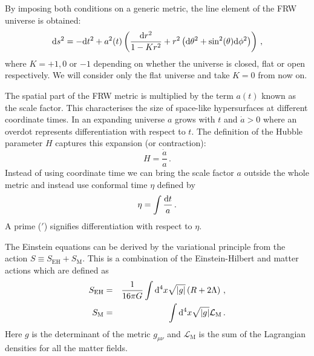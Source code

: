 By imposing both conditions on a generic metric, the line element of the
FRW universe is obtained:
\begin{equation}
 \label{eq:frwmetric-intro}
\mathrm{d} s^2 = -\mathrm{d} t^2 + a^2(t)
  \left( 
    \frac{\mathrm{d} r^2}{1-Kr^2} + r^2\left(\mathrm{d}\theta^2 + \sin^2(\theta) \mathrm{d}\phi^2\right)
  \right)\,,
\end{equation}
where $K=+1, 0$ or $-1$ depending on whether the universe is closed, flat
or open respectively. We will consider only the flat universe and take $K=0$
from now on. 


The spatial part of the FRW metric is multiplied by the term $a(t)$ known as the
scale factor. This characterises the size of space-like hypersurfaces at
different coordinate times. In an expanding universe $a$ grows with $t$ and
$\dot{a}>0$ where an overdot represents differentiation with respect to $t$.
The definition of the Hubble parameter $H$ captures this expansion (or
contraction):
\begin{equation}
 \label{eq:Hdefn-intro}
  H = \frac{\dot{a}}{a} \,.
\end{equation}
% 
Instead of using coordinate time we can bring the scale factor $a$ outside the
whole metric and instead use conformal time $\eta$ defined by
\begin{equation}
\label{eq:etatime-intro}
 \eta = \int\frac{\mathrm{d} t}{a}\,.
\end{equation}
A prime ($'$) signifies differentiation with respect to $\eta$.

The Einstein equations can be derived by the variational principle from the
action $S\equiv S_\mathrm{EH} + S_\mathrm{M}$. This is a combination of the
Einstein-Hilbert and matter actions which are defined as 
% 
\begin{eqnarray}
\label{eq:EHeqn-intro}
 S_\mathrm{EH} &=& \frac{1}{16\pi G}\int \mathrm{d}^4 x \sqrt{|g|} \left(R +
2\Lambda\right) \,,\\
\label{eq:matteraction-intro}
 S_\mathrm{M} &=& \int \mathrm{d}^4 x \sqrt{|g|}
\mathcal{L}_\mathrm{M} \,.
\end{eqnarray}
% 
Here $g$ is the determinant of the metric $g_{\mu\nu}$
and $\mathcal{L}_\mathrm{M}$ is the sum of the Lagrangian densities
for all the matter fields. 


